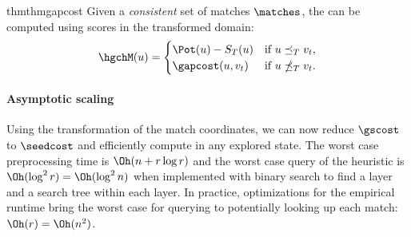 \begin{restatable}{thm}{thmgapcost}\label{lem:gapcost}%
 Given a \emph{consistent} set of matches $\matches$, the \gch can be computed
 using scores in the transformed domain:
\begin{equation*}
  \hgchM(u) =
  \begin{cases}
    \Pot(u) - S_T(u) & \text{if $u\preceq_T v_t$,} \\
    \gapcost(u, v_t) & \text{if $u\npreceq_T v_t$.}
  \end{cases}
\end{equation*}
\end{restatable}

\paragraph{Asymptotic scaling}
Using the transformation of the match coordinates, we can now reduce $\gscost$
to $\seedcost$ and efficiently compute \GCH in any explored state. The worst
case preprocessing time is $\Oh(n+r\log r)$ and the worst case query of the
heuristic is $\Oh(\log^2 r) = \Oh(\log^2 n)$ when implemented with binary search
to find a layer and a search tree within each layer. In practice, optimizations
for the empirical runtime bring the worst case for querying to potentially
looking up each match: $\Oh(r) = \Oh(n^2)$.
